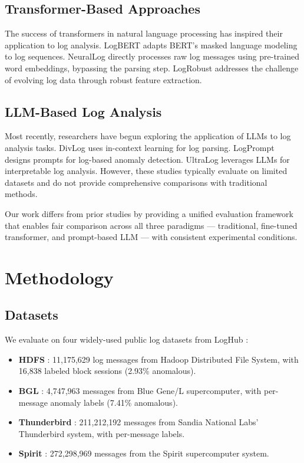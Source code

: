 \documentclass[conference]{IEEEtran}
\begin{document}
\subsection{Transformer-Based Approaches}

The success of transformers in natural language processing has inspired their application to log analysis. LogBERT \cite{guo2021logbert} adapts BERT's masked language modeling to log sequences. NeuralLog \cite{le2021log} directly processes raw log messages using pre-trained word embeddings, bypassing the parsing step. LogRobust \cite{zhang2019robust} addresses the challenge of evolving log data through robust feature extraction.

\subsection{LLM-Based Log Analysis}

Most recently, researchers have begun exploring the application of LLMs to log analysis tasks. DivLog \cite{xu2024divlog} uses in-context learning for log parsing. LogPrompt \cite{liu2024logprompt} designs prompts for log-based anomaly detection. UltraLog \cite{liu2024interpretable} leverages LLMs for interpretable log analysis. However, these studies typically evaluate on limited datasets and do not provide comprehensive comparisons with traditional methods.

Our work differs from prior studies by providing a unified evaluation framework that enables fair comparison across all three paradigms --- traditional, fine-tuned transformer, and prompt-based LLM --- with consistent experimental conditions.

\section{Methodology}

\subsection{Datasets}

We evaluate on four widely-used public log datasets from LogHub \cite{zhu2023loghub}:

\begin{itemize}
    \item \textbf{HDFS} \cite{xu2009detecting}: 11,175,629 log messages from Hadoop Distributed File System, with 16,838 labeled block sessions (2.93\% anomalous).
    \item \textbf{BGL} \cite{oliner2007supercomputers}: 4,747,963 messages from Blue Gene/L supercomputer, with per-message anomaly labels (7.41\% anomalous).
    \item \textbf{Thunderbird} \cite{oliner2007supercomputers}: 211,212,192 messages from Sandia National Labs' Thunderbird system, with per-message labels.
    \item \textbf{Spirit} \cite{oliner2007supercomputers}: 272,298,969 messages from the Spirit supercomputer system.
\end{itemize}
\end{document}

